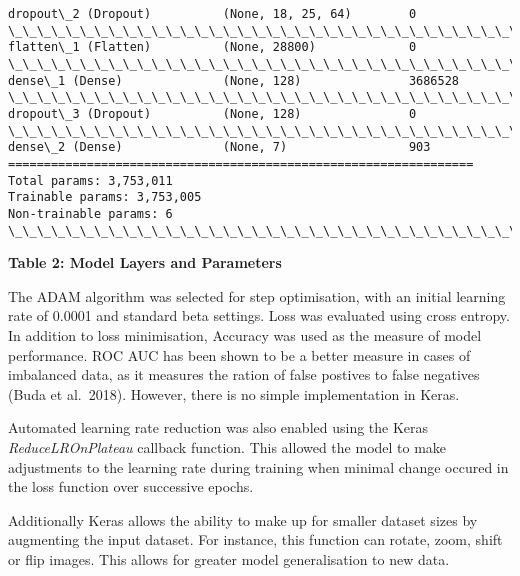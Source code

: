 \documentclass[11pt]{article}
\begin{document}
\begin{Verbatim}[commandchars=\\\{\}]
dropout\_2 (Dropout)          (None, 18, 25, 64)        0         
\_\_\_\_\_\_\_\_\_\_\_\_\_\_\_\_\_\_\_\_\_\_\_\_\_\_\_\_\_\_\_\_\_\_\_\_\_\_\_\_\_\_\_\_\_\_\_\_\_\_\_\_\_\_\_\_\_\_\_\_\_\_\_\_\_
flatten\_1 (Flatten)          (None, 28800)             0         
\_\_\_\_\_\_\_\_\_\_\_\_\_\_\_\_\_\_\_\_\_\_\_\_\_\_\_\_\_\_\_\_\_\_\_\_\_\_\_\_\_\_\_\_\_\_\_\_\_\_\_\_\_\_\_\_\_\_\_\_\_\_\_\_\_
dense\_1 (Dense)              (None, 128)               3686528   
\_\_\_\_\_\_\_\_\_\_\_\_\_\_\_\_\_\_\_\_\_\_\_\_\_\_\_\_\_\_\_\_\_\_\_\_\_\_\_\_\_\_\_\_\_\_\_\_\_\_\_\_\_\_\_\_\_\_\_\_\_\_\_\_\_
dropout\_3 (Dropout)          (None, 128)               0         
\_\_\_\_\_\_\_\_\_\_\_\_\_\_\_\_\_\_\_\_\_\_\_\_\_\_\_\_\_\_\_\_\_\_\_\_\_\_\_\_\_\_\_\_\_\_\_\_\_\_\_\_\_\_\_\_\_\_\_\_\_\_\_\_\_
dense\_2 (Dense)              (None, 7)                 903       
=================================================================
Total params: 3,753,011
Trainable params: 3,753,005
Non-trainable params: 6
\_\_\_\_\_\_\_\_\_\_\_\_\_\_\_\_\_\_\_\_\_\_\_\_\_\_\_\_\_\_\_\_\_\_\_\_\_\_\_\_\_\_\_\_\_\_\_\_\_\_\_\_\_\_\_\_\_\_\_\_\_\_\_\_\_

    \end{Verbatim}

    \textbf{Table 2: Model Layers and Parameters}

    The ADAM algorithm was selected for step optimisation, with an initial
learning rate of 0.0001 and standard beta settings. Loss was evaluated
using cross entropy. In addition to loss minimisation, Accuracy was used
as the measure of model performance. ROC AUC has been shown to be a
better measure in cases of imbalanced data, as it measures the ration of
false postives to false negatives (Buda et al.~2018). However, there is
no simple implementation in Keras.

Automated learning rate reduction was also enabled using the Keras
\emph{ReduceLROnPlateau} callback function. This allowed the model to
make adjustments to the learning rate during training when minimal
change occured in the loss function over successive epochs.

Additionally Keras allows the ability to make up for smaller dataset
sizes by augmenting the input dataset. For instance, this function can
rotate, zoom, shift or flip images. This allows for greater model
generalisation to new data.
\end{document}
